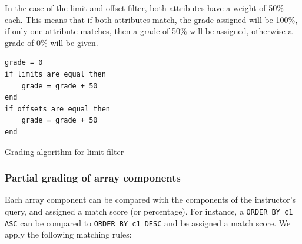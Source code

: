 In the case of the limit and offset filter, both attributes have a weight of 50\% each. This means that if both attributes match, the grade assigned will be 100\%, if only one attribute matches, then a grade of 50\% will be assigned, otherwise a grade of 0\% will be given.
\begin{code}
\begin{verbatim}
grade = 0
if limits are equal then
    grade = grade + 50
end
if offsets are equal then
    grade = grade + 50
end
\end{verbatim}
\caption{Grading algorithm for limit filter}
\end{code}
\subsubsection{Partial grading of array components}

Each array component can be compared with the components of the instructor's query, and assigned a match score (or percentage). For instance, a \texttt{ORDER BY c1 ASC} can be compared to \texttt{ORDER BY c1 DESC} and be assigned a match score. We apply the following matching rules:

